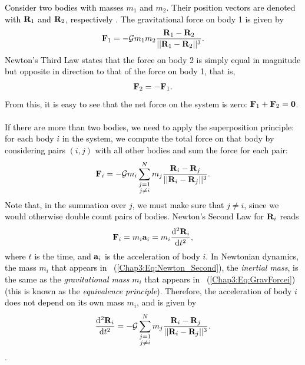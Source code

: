 \documentclass[main.tex]{subfiles}
\begin{document}
\begin{tcolorbox}[sharp corners, colback=blue!30, colframe=blue!80!blue, title=Orbital Dynamics II$^2$]
\par \textcolor{black}{Consider two bodies with masses $m_1$ and $m_2$. Their position vectors are denoted with ${\mathbf{R}}_1$ and ${\mathbf{R}}_2$, respectively . The gravitational force on body 1 is given by
\begin{align}
\label{Chap3:Eq:F_1_vec}
{\mathbf{F}}_{1} = - \mathcal{G} m_1m_2 \frac{{\mathbf{R}}_1 - {\mathbf{R}}_2}{|| {\mathbf{R}}_1 - {\mathbf{R}}_2||^3}.
\end{align}
 Newton's Third Law states that the force on body 2 is simply equal in magnitude but opposite in direction to that of the force on body 1, that is,
\begin{align}
{\mathbf{F}}_{2} = - {\mathbf{F}}_{1}.
\end{align}
From this, it is easy to see that the net force on the system is zero: ${\mathbf{F}}_1 + {\mathbf{F}}_2 = {\mathbf{0}}$. \\ \\
If there are more than two bodies, we need to apply the superposition principle: for each body $i$ in the system, we compute the total force on that body by considering pairs $(i,j)$ with all other bodies and sum the force for each pair:
\begin{align}
\label{Chap3:Eq:GravForcei}
{\mathbf{F}}_i = -\mathcal{G} m_i \sum_{\substack{j=1 \\ j\neq i}}^{N} m_j \frac{ {\mathbf{R}}_i - {\mathbf{R}}_j}{|| {\mathbf{R}}_i - {\mathbf{R}}_j||^3}.
\end{align}
Note that, in the summation over $j$, we must make sure that $j\neq i$, since we would otherwise double count pairs of bodies. Newton's Second Law for ${\mathbf{R}}_i$ reads
\begin{align}
\label{Chap3:Eq:Newton_Second}
{\mathbf{F}}_i = m_i {\mathbf{a}}_i = m_i \frac{\mathrm{d}^2 {\mathbf{R}}_i}{\mathrm{d} t^2},
\end{align}
where $t$ is the time, and ${\mathbf{a}}_i$ is the acceleration of body $i$. In Newtonian dynamics, the mass $m_i$ that appears in \Eq~(\ref{Chap3:Eq:Newton_Second}), the {\it inertial mass}, is the same as the {\it gravitational mass} $m_i$ that appears in \Eq~(\ref{Chap3:Eq:GravForcei}) (this is known as the {\it equivalence principle}). Therefore, the acceleration of body $i$ does not depend on its own mass $m_i$, and is given by
\begin{align}
\label{Chap3:Eq:EOM}
\frac{\mathrm{d}^2 {\mathbf{R}}_i}{\mathrm{d} t^2} = - \mathcal{G} \sum_{\substack{j=1 \\ j\neq i}}^{N} m_j \frac{ {\mathbf{R}}_i - {\mathbf{R}}_j}{|| {\mathbf{R}}_i - {\mathbf{R}}_j||^3}.
\end{align}
}.  
\end{tcolorbox}
\end{document}
